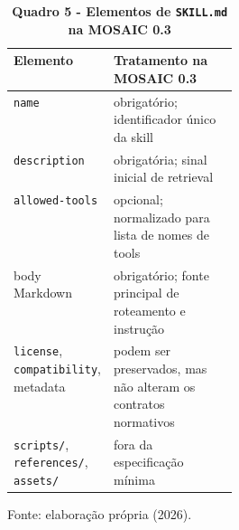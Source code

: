 \begin{table}[H]
\centering
\caption*{\textbf{Quadro 5 - Elementos de \texttt{SKILL.md} na MOSAIC 0.3}}
\small
\renewcommand{\arraystretch}{1.16}
\begin{tabularx}{\linewidth}{|p{0.29\linewidth}|Y|}
\hline
\textbf{Elemento} & \textbf{Tratamento na MOSAIC 0.3} \\
\hline
\texttt{name} & obrigatório; identificador único da skill \\
\hline
\texttt{description} & obrigatória; sinal inicial de retrieval \\
\hline
\texttt{allowed-tools} & opcional; normalizado para lista de nomes de tools \\
\hline
body Markdown & obrigatório; fonte principal de roteamento e instrução \\
\hline
\texttt{license}, \texttt{compatibility}, metadata &
podem ser preservados, mas não alteram os contratos normativos \\
\hline
\texttt{scripts/}, \texttt{references/}, \texttt{assets/} &
fora da especificação mínima \\
\hline
\end{tabularx}
\par\smallskip\raggedright\small Fonte: elaboração própria (2026).
\end{table}
